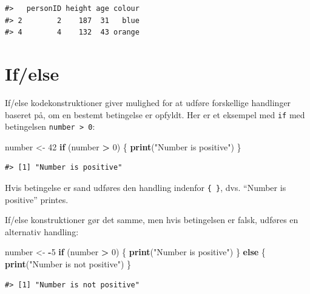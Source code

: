 \documentclass[
]{book}
\newenvironment{Shaded}{\begin{snugshade}}{\end{snugshade}}
\newcommand{\ControlFlowTok}[1]{\textcolor[rgb]{0.27,0.27,0.27}{\textbf{#1}}}
\newcommand{\DecValTok}[1]{\textcolor[rgb]{0.06,0.06,0.06}{#1}}
\newcommand{\FunctionTok}[1]{\textcolor[rgb]{0.27,0.27,0.27}{\textbf{#1}}}
\newcommand{\NormalTok}[1]{#1}
\newcommand{\OtherTok}[1]{\textcolor[rgb]{0.37,0.37,0.37}{#1}}
\newcommand{\SpecialCharTok}[1]{\textcolor[rgb]{0.43,0.43,0.43}{\textbf{#1}}}
\newcommand{\StringTok}[1]{\textcolor[rgb]{0.5,0.5,0.5}{#1}}
\begin{document}
\begin{verbatim}
#>   personID height age colour
#> 2        2    187  31   blue
#> 4        4    132  43 orange
\end{verbatim}

\section{If/else}\label{ifelse}

If/else kodekonstruktioner giver mulighed for at udføre forskellige handlinger baseret på, om en bestemt betingelse er opfyldt. Her er et eksempel med \texttt{if} med betingelsen \texttt{number\ \textgreater{}\ 0}:

\begin{Shaded}
\begin{Highlighting}[]
\NormalTok{number }\OtherTok{\textless{}{-}} \DecValTok{42}
\ControlFlowTok{if}\NormalTok{ (number }\SpecialCharTok{\textgreater{}} \DecValTok{0}\NormalTok{) \{}
  \FunctionTok{print}\NormalTok{(}\StringTok{"Number is positive"}\NormalTok{)}
\NormalTok{\}}
\end{Highlighting}
\end{Shaded}

\begin{verbatim}
#> [1] "Number is positive"
\end{verbatim}

Hvis betingelse er sand udføres den handling indenfor \texttt{\{\ \}}, dvs. ``Number is positive'' printes.

If/else konstruktioner gør det samme, men hvis betingelsen er falsk, udføres en alternativ handling:

\begin{Shaded}
\begin{Highlighting}[]
\NormalTok{number }\OtherTok{\textless{}{-}} \SpecialCharTok{{-}}\DecValTok{5}
\ControlFlowTok{if}\NormalTok{ (number }\SpecialCharTok{\textgreater{}} \DecValTok{0}\NormalTok{) \{}
  \FunctionTok{print}\NormalTok{(}\StringTok{"Number is positive"}\NormalTok{)}
\NormalTok{\} }\ControlFlowTok{else}\NormalTok{ \{}
  \FunctionTok{print}\NormalTok{(}\StringTok{"Number is not positive"}\NormalTok{)}
\NormalTok{\}}
\end{Highlighting}
\end{Shaded}

\begin{verbatim}
#> [1] "Number is not positive"
\end{verbatim}
\end{document}
